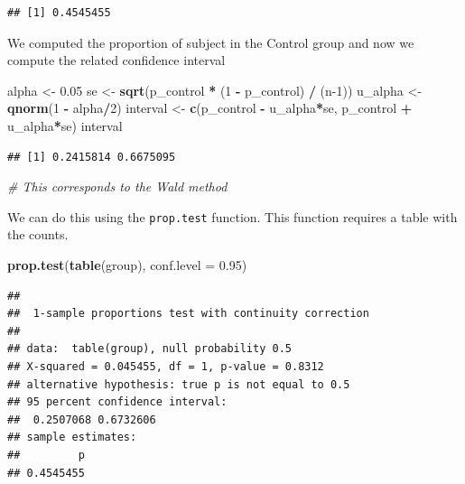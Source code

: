 \documentclass[
]{article}
\newenvironment{Shaded}{\begin{snugshade}}{\end{snugshade}}
\newcommand{\AttributeTok}[1]{\textcolor[rgb]{0.13,0.29,0.53}{#1}}
\newcommand{\CommentTok}[1]{\textcolor[rgb]{0.56,0.35,0.01}{\textit{#1}}}
\newcommand{\DecValTok}[1]{\textcolor[rgb]{0.00,0.00,0.81}{#1}}
\newcommand{\FloatTok}[1]{\textcolor[rgb]{0.00,0.00,0.81}{#1}}
\newcommand{\FunctionTok}[1]{\textcolor[rgb]{0.13,0.29,0.53}{\textbf{#1}}}
\newcommand{\NormalTok}[1]{#1}
\newcommand{\OtherTok}[1]{\textcolor[rgb]{0.56,0.35,0.01}{#1}}
\newcommand{\SpecialCharTok}[1]{\textcolor[rgb]{0.81,0.36,0.00}{\textbf{#1}}}
\begin{document}
\begin{verbatim}
## [1] 0.4545455
\end{verbatim}

We computed the proportion of subject in the Control group and now we
compute the related confidence interval

\begin{Shaded}
\begin{Highlighting}[]
\NormalTok{alpha }\OtherTok{\textless{}{-}} \FloatTok{0.05}
\NormalTok{se }\OtherTok{\textless{}{-}} \FunctionTok{sqrt}\NormalTok{(p\_control }\SpecialCharTok{*}\NormalTok{ (}\DecValTok{1} \SpecialCharTok{{-}}\NormalTok{ p\_control) }\SpecialCharTok{/}\NormalTok{ (n}\DecValTok{{-}1}\NormalTok{))}
\NormalTok{u\_alpha }\OtherTok{\textless{}{-}} \FunctionTok{qnorm}\NormalTok{(}\DecValTok{1} \SpecialCharTok{{-}}\NormalTok{ alpha}\SpecialCharTok{/}\DecValTok{2}\NormalTok{)}
\NormalTok{interval }\OtherTok{\textless{}{-}} \FunctionTok{c}\NormalTok{(p\_control }\SpecialCharTok{{-}}\NormalTok{ u\_alpha}\SpecialCharTok{*}\NormalTok{se,}
\NormalTok{              p\_control }\SpecialCharTok{+}\NormalTok{ u\_alpha}\SpecialCharTok{*}\NormalTok{se)}
\NormalTok{interval}
\end{Highlighting}
\end{Shaded}

\begin{verbatim}
## [1] 0.2415814 0.6675095
\end{verbatim}

\begin{Shaded}
\begin{Highlighting}[]
\CommentTok{\# This corresponds to the Wald method}
\end{Highlighting}
\end{Shaded}

We can do this using the \texttt{prop.test} function. This function
requires a table with the counts.

\begin{Shaded}
\begin{Highlighting}[]
\FunctionTok{prop.test}\NormalTok{(}\FunctionTok{table}\NormalTok{(group), }\AttributeTok{conf.level =} \FloatTok{0.95}\NormalTok{)}
\end{Highlighting}
\end{Shaded}

\begin{verbatim}
## 
##  1-sample proportions test with continuity correction
## 
## data:  table(group), null probability 0.5
## X-squared = 0.045455, df = 1, p-value = 0.8312
## alternative hypothesis: true p is not equal to 0.5
## 95 percent confidence interval:
##  0.2507068 0.6732606
## sample estimates:
##         p 
## 0.4545455
\end{verbatim}
\end{document}
